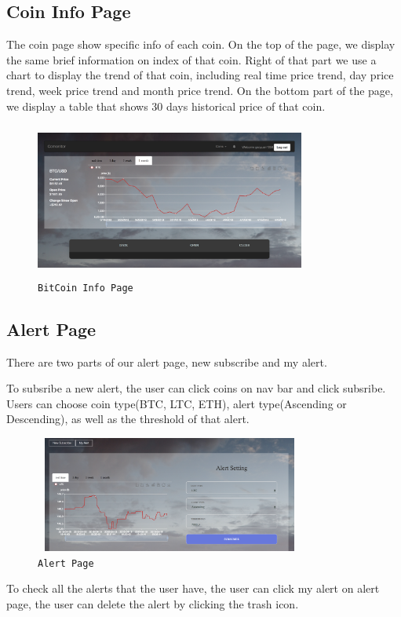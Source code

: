\subsection{Coin Info Page}
The coin page show specific info of each coin. On the top of the page, we display 
the same brief information on index of that coin. Right of that part we use a chart
to display the trend of that coin, including real time price trend, day price trend,
week price trend and month price trend. On the bottom part of the page, we display
a table that shows 30 days historical price of that coin.
\begin{figure}[!htb]
\includegraphics[height=2.0in, width=3.5in]{coinpage.png}
\caption{\texttt{BitCoin Info Page}}
\end{figure}

\subsection{Alert Page}
There are two parts of our alert page, new subscribe and my alert.

To subsribe a new alert, the user can click coins on nav bar and click subsribe. Users
can choose coin type(BTC, LTC, ETH), alert type(Ascending or Descending), as well as the 
threshold of that alert.

\begin{figure}[!htb]
\includegraphics[height=1.5in, width=3.5in]{alert.png}
\caption{\texttt{Alert Page}}
\end{figure}


To check all the alerts that the user have, the user can click my alert on alert page,
the user can delete the alert by clicking the trash icon.

